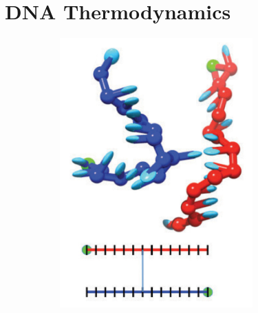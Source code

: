 \section{DNA Thermodynamics}

\begin{figure}[ht]
  \begin{centering}
  \hspace{-0.3cm}
  \begin{subfigure}[t]{\dimexpr.15\linewidth-1.3em\relax}
  \centering
  \includegraphics[width=1.06\linewidth,valign=t]{Figures/hybridDiag1.png}
  \end{subfigure}%
  \hspace{-0.35cm}
  \begin{subfigure}[t]{\dimexpr.15\linewidth-1.3em\relax}

\end{subfigure}
\end{centering}
\end{figure}
